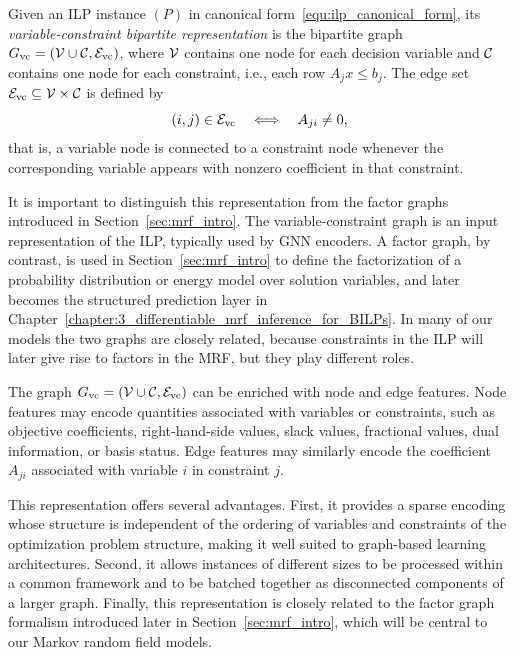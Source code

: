 \begin{definition}
    Given an ILP instance $(P)$ in canonical form~\eqref{equ:ilp_canonical_form}, its \emph{variable-constraint bipartite representation} is the bipartite graph $G_{\mathrm{vc}}=(\mathcal{V} \cup \mathcal{C}, \mathcal{E}_{\mathrm{vc}})$, where $\mathcal{V}$ contains one node for each decision variable and $\mathcal{C}$ contains one node for each constraint, i.e., each row $A_j x \leq b_j$. The edge set $\mathcal{E}_{\mathrm{vc}} \subseteq \mathcal{V} \times \mathcal{C}$ is defined by
    \begin{equation*}
        (i,j)\in \mathcal{E}_{\mathrm{vc}}
        \quad \Longleftrightarrow \quad
        A_{ji} \neq 0,
    \end{equation*}
    that is, a variable node is connected to a constraint node whenever the corresponding variable appears with nonzero coefficient in that constraint.
\end{definition}

It is important to distinguish this representation from the factor graphs introduced in Section~\ref{sec:mrf_intro}. The variable-constraint graph is an input representation of the ILP, typically used by GNN encoders. A factor graph, by contrast, is used in Section~\ref{sec:mrf_intro} to define the factorization of a probability distribution or energy model over solution variables, and later becomes the structured prediction layer in Chapter~\ref{chapter:3_differentiable_mrf_inference_for_BILPs}. In many of our models the two graphs are closely related, because constraints in the ILP will later give rise to factors in the MRF, but they play different roles.



The graph $G_{\mathrm{vc}}=(\mathcal{V} \cup \mathcal{C}, \mathcal{E}_{\mathrm{vc}})$ can be enriched with node and edge features. Node features may encode quantities associated with variables or constraints, such as objective coefficients, right-hand-side values, slack values, fractional values, dual information, or basis status. Edge features may similarly encode the coefficient $A_{ji}$ associated with variable $i$ in constraint $j$.

This representation offers several advantages. First, it provides a sparse encoding whose structure is independent of the ordering of variables and constraints of the optimization problem structure, making it well suited to graph-based learning architectures. Second, it allows instances of different sizes to be processed within a common framework and to be batched together as disconnected components of a larger graph. Finally, this representation is closely related to the factor graph formalism introduced later in Section~\ref{sec:mrf_intro}, which will be central to our Markov random field models.


